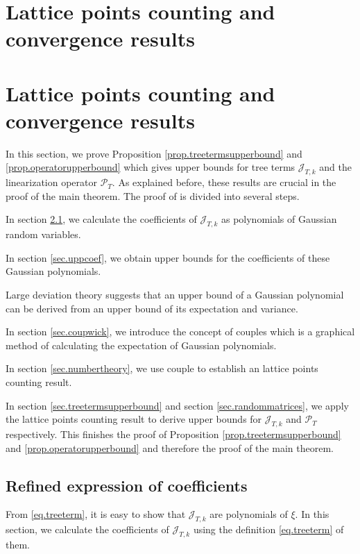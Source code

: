 \section{Lattice points counting and convergence results}

\section{Lattice points counting and convergence results}
In this section, we prove Proposition \ref{prop.treetermsupperbound} and \ref{prop.operatorupperbound} which gives upper bounds for tree terms $\mathcal{J}_{T,k}$ and the linearization operator $\mathcal{P}_T$. As explained before, these results are crucial in the proof of the main theorem. The proof of is divided into several steps.

In section \ref{sec.refexp}, we calculate the coefficients of $\mathcal{J}_{T,k}$ as polynomials of Gaussian random variables.

In section \ref{sec.uppcoef}, we obtain upper bounds for the coefficients of these Gaussian polynomials.

Large deviation theory suggests that an upper bound of a Gaussian polynomial can be derived from an upper bound of its expectation and variance.

In section \ref{sec.coupwick}, we introduce the concept of couples which is a graphical method of calculating the expectation of Gaussian polynomials.

In section \ref{sec.numbertheory}, we use couple to establish an lattice points counting result.

In section \ref{sec.treetermsupperbound} and section \ref{sec.randommatrices}, we apply the lattice points counting result to derive upper bounds for  $\mathcal{J}_{T,k}$ and $\mathcal{P}_T$ respectively. This finishes the proof of Proposition \ref{prop.treetermsupperbound} and \ref{prop.operatorupperbound} and therefore the proof of the main theorem.


\subsection{Refined expression of coefficients}\label{sec.refexp} From \eqref{eq.treeterm}, it is easy to show that $\mathcal{J}_{T,k}$ are polynomials of $\xi$. In this section, we calculate the coefficients of $\mathcal{J}_{T,k}$ using the definition \eqref{eq.treeterm} of them.

